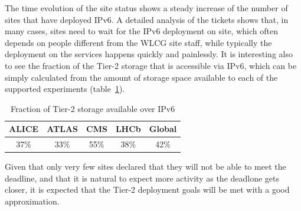 The time evolution of the site status shows a steady increase of the
number of sites that have deployed IPv6. A detailed analysis of the
tickets shows that, in many cases, sites need to wait for the IPv6
deployment on site, which often depends on people different from the
WLCG site staff, while typically the deployment on the services
happens quickly and painlessly. It is interesting also to see the
fraction of the Tier-2 storage that is accessible via IPv6, which can
be simply calculated from the amount of storage space available to
each of the supported experiments (table~\ref{tab:t2stor}).
\begin{table}[h]
\centering
\caption{Fraction of Tier-2 storage available over IPv6}
\label{tab:t2stor}
\begin{tabular}{ccccc}
\hline
ALICE & ATLAS & CMS & LHCb & Global \\\hline
37\% & 33\% & 55\% & 38\% & 42\% \\\hline
\end{tabular}
\end{table}
Given that only very few sites declared that they will not be able to
meet the deadline, and that it is natural to expect more activity as
the deadlone gets closer, it is expected that the Tier-2 deployment
goals will be met with a good approximation.
